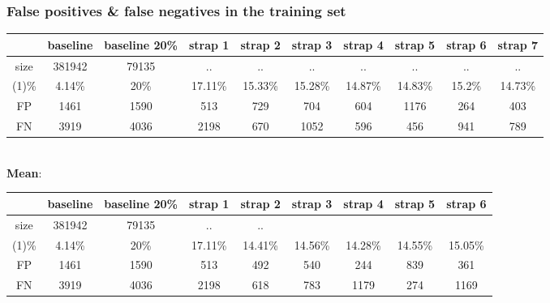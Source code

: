 \documentclass[10pt]{article}
\newcommand{\1}{\mathbbm{1}}
\newcommand{\0}{\mathbf{0}}
\begin{document}
\subsubsection*{False positives \& false negatives in the training set}
\begin{table}[H]
    \begin{tabular}{|c|c|c||c|c|c|c|c|c|c|}
    \hline
            & baseline & baseline 20\% & strap 1 & strap 2 & strap 3  & strap 4 & strap 5  & strap 6   & strap 7\\
    \hline
    size    & 381942   & 79135         & ..      & ..      &  ..      & ..      &  ..      & ..        & ..     \\
    (1)\%   &  4.14\%  &   20\%        & 17.11\% & 15.33\% &  15.28\% & 14.87\% & 14.83\%  & 15.2\%    & 14.73\% \\
    FP      & 1461     &  1590         & 513     &   729   &   704    & 604     &  1176    &  264      &  403    \\
    FN      & 3919     &  4036         & 2198    &   670   &   1052   & 596     &   456    &  941      &  789   \\
    \hline
    \end{tabular}
    \vspace{10pt}
    \\
    \vspace{10pt}
    \textbf{Mean}:\\
    \begin{tabular}{|c|c|c||c|c|c|c|c|c|}
    \hline
            & baseline & baseline 20\% & strap 1 & strap 2         &  strap 3         &  strap 4    & strap 5    & strap 6\\
    \hline
    size    & 381942   & 79135         & ..      & ..              &                  &             &            & \\
    (1)\%   &  4.14\%  &   20\%        & 17.11\% &    14.41\%      &   14.56\%        &    14.28\%  &  14.55\%   & 15.05\%\\
    FP      & 1461     &  1590         & 513     &     492         &     540          &     244     &   839      & 361    \\
    FN      & 3919     &  4036         & 2198    &     618         &     783          &    1179     &   274      & 1169 \\
    \hline
    \end{tabular}
\end{table}
\newpage
\end{document}
